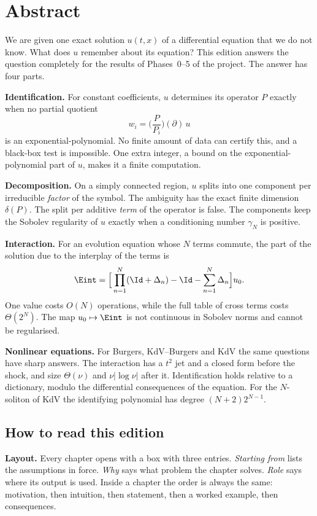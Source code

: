 \chapter*{Abstract}

We are given one exact solution $u(t,x)$ of a differential equation that we do not know. What does $u$ remember about its equation? This edition answers the question completely for the results of Phases~0--5 of the project. The answer has four parts.

\textbf{Identification.} For constant coefficients, $u$ determines its operator $P$ exactly when no partial quotient
\[
w_i=\Big(\frac{P}{P_i}\Big)(\partial)\,u
\]
is an exponential-polynomial. No finite amount of data can certify this, and a black-box test is impossible. One extra integer, a bound on the exponential-polynomial part of $u$, makes it a finite computation.

\textbf{Decomposition.} On a simply connected region, $u$ splits into one component per irreducible \emph{factor} of the symbol. The ambiguity has the exact finite dimension $\delta(P)$. The split per additive \emph{term} of the operator is false. The components keep the Sobolev regularity of $u$ exactly when a conditioning number $\gamma_N$ is positive.

\textbf{Interaction.} For an evolution equation whose $N$ terms commute, the part of the solution due to the interplay of the terms is
\[
\Eint=\Big[\prod_{n=1}^N(\Id+\Delta_n)-\Id-\sum_{n=1}^N\Delta_n\Big]u_0 .
\]
One value costs $O(N)$ operations, while the full table of cross terms costs $\Theta(2^N)$. The map $u_0\mapsto\Eint$ is not continuous in Sobolev norms and cannot be regularised.

\textbf{Nonlinear equations.} For Burgers, KdV--Burgers and KdV the same questions have sharp answers. The interaction has a $t^2$ jet and a closed form before the shock, and size $\Theta(\nu)$ and $\nu|\log\nu|$ after it. Identification holds relative to a dictionary, modulo the differential consequences of the equation. For the $N$-soliton of KdV the identifying polynomial has degree $(N+2)2^{N-1}$.

\section*{How to read this edition}

\textbf{Layout.} Every chapter opens with a box with three entries. \emph{Starting from} lists the assumptions in force. \emph{Why} says what problem the chapter solves. \emph{Role} says where its output is used. Inside a chapter the order is always the same: motivation, then intuition, then statement, then a worked example, then consequences.

